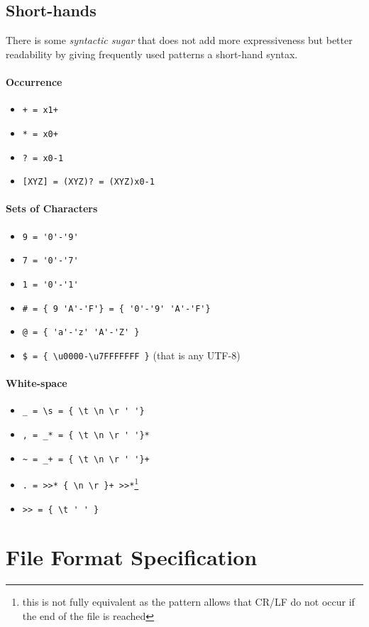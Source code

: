 \documentclass[10pt,a4paper]{article}
\begin{document}
\subsection{Short-hands}
There is some \textit{syntactic sugar} that does not add more expressiveness but better readability by giving frequently used patterns a short-hand syntax.

\paragraph*{Occurrence}
\begin{itemize}
\item \verb!+ = x1+!
\item \verb!* = x0+!
\item \verb!? = x0-1!
\item \verb![XYZ] = (XYZ)? = (XYZ)x0-1!
\end{itemize}

\paragraph*{Sets of Characters}
\begin{itemize}
\item \verb!9 = '0'-'9'!
\item \verb!7 = '0'-'7'!
\item \verb!1 = '0'-'1'!
\item \verb!# = { 9 'A'-'F'} = { '0'-'9' 'A'-'F'}!
\item \verb!@ = { 'a'-'z' 'A'-'Z' }!
\item \verb!$ = { \u0000-\u7FFFFFFF }! (that is any UTF-8)
\end{itemize}

\paragraph*{White-space}
\begin{itemize}
\item \verb$_ = \s = { \t \n \r ' '}$
\item \verb$, = _* = { \t \n \r ' '}*$
\item \verb$~ = _+ = { \t \n \r ' '}+$
\item \verb$. = >>* { \n \r }+ >>*$\footnote{this is not fully equivalent as the pattern allows that CR/LF do not occur if the end of the file is reached}
\item \verb$>> = { \t ' ' }$
\end{itemize}

\newpage


\section{File Format Specification}
\end{document}
